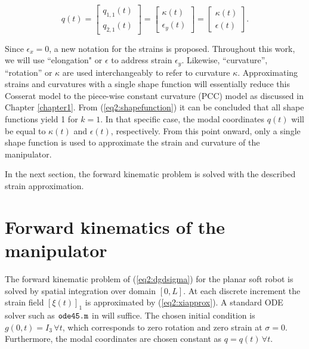 \begin{equation}
q(t) = \begin{bmatrix} q_{1,1}(t) \\ q_{2,1}(t) \end{bmatrix} = \begin{bmatrix} \kappa(t) \\ \epsilon_y(t) \end{bmatrix} = \begin{bmatrix} \kappa(t) \\ \epsilon(t) \end{bmatrix}.
\end{equation}

Since $\epsilon_x = 0$, a new notation for the strains is proposed. Throughout this work, we will use ``elongation" or $\epsilon$ to address strain $\epsilon_y$. Likewise, ``curvature'', ``rotation'' or  $\kappa$ are used interchangeably to refer to curvature $\kappa$. Approximating strains and curvatures with a single shape function will essentially reduce this Cosserat model to the piece-wise constant curvature (PCC) model as discussed in Chapter \ref{chapter1}. From (\ref{eq2:shapefunction}) it can be concluded that all shape functions yield 1 for $k=1$. In that specific case, the modal coordinates $q(t)$ will be equal to $\kappa(t)$ and $\epsilon(t)$, respectively. From this point onward, only a single shape function is used to approximate the strain and curvature of the manipulator. 

In the next section, the forward kinematic problem is solved with the described strain approximation.




\section{Forward kinematics of the manipulator}

The forward kinematic problem of (\ref{eq2:dgdsigma}) for the
planar soft robot is solved by spatial integration over domain $[0,L]$. At each discrete increment the strain field $[\xi(t)]_1$ is approximated by (\ref{eq2:xiapprox}). A standard ODE solver such as $\verb+ode45.m+$ in \MATLAB \cite{MATLAB2020} will suffice. The chosen initial condition is $g(0,t) = I_3 \hspace{2pt} \forall t$, which corresponds to zero rotation and zero strain at $\sigma = 0$. Furthermore, the modal coordinates are chosen constant as $q = q(t) \hspace{2pt} \forall t$. 

